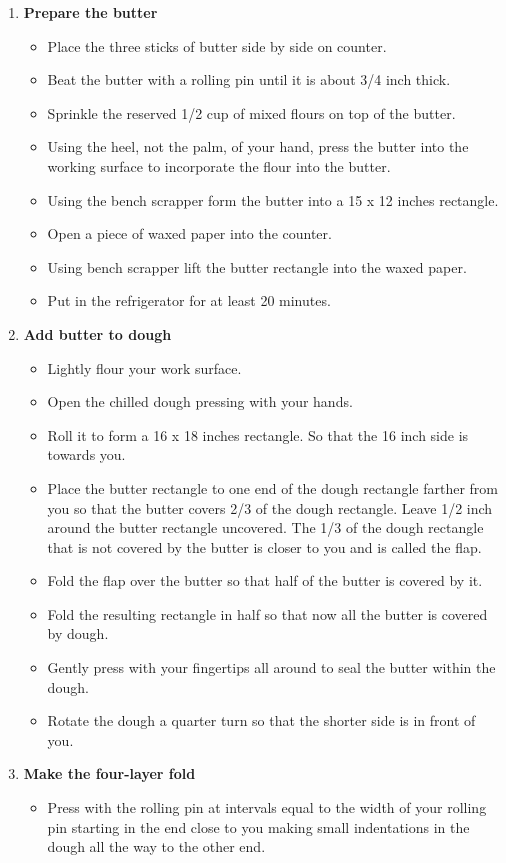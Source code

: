 \documentclass[11pt,letterpaper]{article}
\begin{document}
\begin{description}
\begin{enumerate}
	\item {\bf Prepare the butter}
	\begin{itemize}
	\item Place the three sticks of butter side by side on counter.
	\item Beat the butter with a rolling pin until it is about 3/4 inch thick. 
	\item Sprinkle the reserved 1/2 cup of mixed flours on top of the butter.
	\item Using the heel, not the palm, of your hand, press the butter into the working surface to incorporate the flour into the butter.
	\item Using the bench scrapper form the butter into a 15 x 12 inches rectangle.
	\item Open a piece of waxed paper into the counter.
	\item Using bench scrapper lift the butter rectangle into the waxed paper.
	\item Put in the refrigerator for at least 20 minutes.
	\end{itemize}
	\item {\bf Add butter to dough}
	\begin{itemize}
	\item Lightly flour your work surface.
	\item Open the chilled dough pressing with your hands.
	\item Roll it to form a 16 x 18 inches rectangle. So that the 16 inch side is towards you.
	\item Place the butter rectangle to one end of the dough rectangle farther from you so that the butter covers 2/3 of the dough rectangle. Leave 1/2 inch around the butter rectangle uncovered. The 1/3 of the dough rectangle that is not covered by the butter is closer to you and is called the flap.
	\item Fold the flap over the butter so that half of the butter is covered by it.
	\item Fold the resulting rectangle in half so that now all the butter is covered by dough.
	\item Gently press with your fingertips all around to seal the butter within the dough.
	\item Rotate the dough a quarter turn so that the shorter side is in front of you. 
	\end{itemize}
	\item {\bf Make the four-layer fold}
	\begin{itemize}
	\item Press with the rolling pin at intervals equal to the width of your rolling pin starting in the end close to you making small indentations in the dough all the way to the other end.

\end{itemize}
\end{enumerate}
\end{description}
\end{document}

